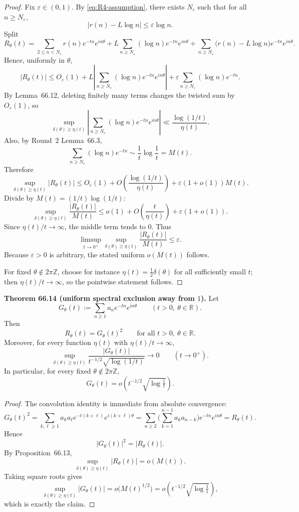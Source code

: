 \begin{proof}
Fix $\varepsilon\in(0,1)$.  By \eqref{eq:R4-assumption}, there exists $N_\varepsilon$ such that for all $n\ge N_\varepsilon$,
\[
|r(n)-L\log n|\le \varepsilon\log n.
\]
Split
\[
R_\theta(t)
=\sum_{2\le n< N_\varepsilon} r(n)e^{-tn}e^{in\theta}
+L\sum_{n\ge N_\varepsilon}(\log n)e^{-tn}e^{in\theta}
+\sum_{n\ge N_\varepsilon}\big(r(n)-L\log n\big)e^{-tn}e^{in\theta}.
\]
Hence, uniformly in $\theta$,
\[
|R_\theta(t)|
\le O_\varepsilon(1)
+L\left|\sum_{n\ge N_\varepsilon}(\log n)e^{-tn}e^{in\theta}\right|
+\varepsilon\sum_{n\ge N_\varepsilon}(\log n)e^{-tn}.
\]
By Lemma~66.12, deleting finitely many terms changes the twisted sum by $O_\varepsilon(1)$, so
\[
\sup_{\delta(\theta)\ge \eta(t)}
\left|\sum_{n\ge N_\varepsilon}(\log n)e^{-tn}e^{in\theta}\right|
\ll \frac{\log(1/t)}{\eta(t)}.
\]
Also, by Round~2 Lemma~66.3,
\[
\sum_{n\ge N_\varepsilon}(\log n)e^{-tn}
\sim \frac1t\log\frac1t = M(t).
\]
Therefore
\[
\sup_{\delta(\theta)\ge \eta(t)} |R_\theta(t)|
\le O_\varepsilon(1)+O\!\left(\frac{\log(1/t)}{\eta(t)}\right)+\varepsilon(1+o(1))M(t).
\]
Divide by $M(t)=(1/t)\log(1/t)$:
\[
\sup_{\delta(\theta)\ge \eta(t)} \frac{|R_\theta(t)|}{M(t)}
\le o(1)+O\!\left(\frac{t}{\eta(t)}\right)+\varepsilon(1+o(1)).
\]
Since $\eta(t)/t\to\infty$, the middle term tends to $0$.  Thus
\[
\limsup_{t\to0^+}
\sup_{\delta(\theta)\ge \eta(t)} \frac{|R_\theta(t)|}{M(t)}
\le \varepsilon.
\]
Because $\varepsilon>0$ is arbitrary, the stated uniform $o(M(t))$ follows.

For fixed $\theta\notin 2\pi\mathbb Z$, choose for instance $\eta(t)=\tfrac12\delta(\theta)$ for all sufficiently small $t$; then $\eta(t)/t\to\infty$, so the pointwise statement follows.
\end{proof}

\medskip
\noindent\textbf{Theorem 66.14 (uniform spectral exclusion away from $1$).}
Let
\[
G_\theta(t):=\sum_{n\ge1} a_n e^{-tn}e^{in\theta}
\qquad(t>0,\ \theta\in\mathbb R).
\]
Then
\[
R_\theta(t)=G_\theta(t)^2
\qquad\text{for all }t>0,\ \theta\in\mathbb R.
\]
Moreover, for every function $\eta(t)$ with $\eta(t)/t\to\infty$,
\[
\sup_{\delta(\theta)\ge \eta(t)}
\frac{|G_\theta(t)|}{t^{-1/2}\sqrt{\log(1/t)}}\to0
\qquad(t\to0^+).
\]
In particular, for every fixed $\theta\notin 2\pi\mathbb Z$,
\[
G_\theta(t)=o\!\left(t^{-1/2}\sqrt{\log\tfrac1t}\right).
\]

\begin{proof}
The convolution identity is immediate from absolute convergence:
\[
G_\theta(t)^2
=\sum_{k,\ell\ge1} a_ka_\ell e^{-t(k+\ell)}e^{i(k+\ell)\theta}
=\sum_{n\ge2}\Big(\sum_{k=1}^{n-1}a_ka_{n-k}\Big)e^{-tn}e^{in\theta}
=R_\theta(t).
\]
Hence
\[
|G_\theta(t)|^2=|R_\theta(t)|.
\]
By Proposition~66.13,
\[
\sup_{\delta(\theta)\ge \eta(t)} |R_\theta(t)| = o(M(t)).
\]
Taking square roots gives
\[
\sup_{\delta(\theta)\ge \eta(t)} |G_\theta(t)| = o\big(M(t)^{1/2}\big)
=o\!\left(t^{-1/2}\sqrt{\log\tfrac1t}\right),
\]
which is exactly the claim.
\end{proof}

